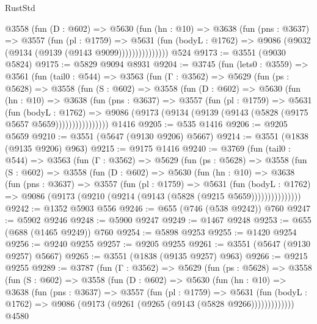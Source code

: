 \begin{lexlean}{RustStd}
\begin{coremodule}
              @3558
                (fun (D : @602) =>
                @5630
                  (fun (hn : @10) =>
                  @3638
                    (fun (pns : @3637) =>
                    @3557
                      (fun (pl : @1759) =>
                      @5631
                        (fun (bodyL : @1762) =>
                        @9086 (@9032 (@9134 (@9139 (@9143 @9099)))))))))))))))
    @524
@9173 := @3551 (@9030 @5824)
@9175 := @5829 @9094 @8931
@9204 := @3745
    (fun (lets0 : @3559) =>
    @3561
      (fun (tail0 : @544) =>
      @3563
        (fun (Γ : @3562) =>
        @5629
          (fun (ps : @5628) =>
          @3558
            (fun (S : @602) =>
            @3558
              (fun (D : @602) =>
              @5630
                (fun (hn : @10) =>
                @3638
                  (fun (pns : @3637) =>
                  @3557
                    (fun (pl : @1759) =>
                    @5631
                      (fun (bodyL : @1762) =>
                      @9086 (@9173 (@9134 (@9139 (@9143 (@5828 (@9175 @5657 @5659))))))))))))))))
    @1416
@9205 := @535 @1416
@9206 := @9205 @5659
@9210 := @3551 (@5647 (@9130 @9206) @5667)
@9214 := @3551 (@1838 (@9135 @9206) @963)
@9215 := @9175 @1416
@9240 := @3769
    (fun (tail0 : @544) =>
    @3563
      (fun (Γ : @3562) =>
      @5629
        (fun (ps : @5628) =>
        @3558
          (fun (S : @602) =>
          @3558
            (fun (D : @602) =>
            @5630
              (fun (hn : @10) =>
              @3638
                (fun (pns : @3637) =>
                @3557
                  (fun (pl : @1759) =>
                  @5631
                    (fun (bodyL : @1762) =>
                    @9086 (@9173 (@9210 (@9214 (@9143 (@5828 (@9215 @5659)))))))))))))))
@9242 := @1352 @5903 @556
@9246 := @655 (@746 (@538 @9242)) @760
@9247 := @5902 @9246
@9248 := @5900 @9247
@9249 := @1467 @9248
@9253 := @655 (@688 (@1465 @9249)) @760
@9254 := @5898 @9253
@9255 := @1420 @9254
@9256 := @9240 @9255
@9257 := @9205 @9255
@9261 := @3551 (@5647 (@9130 @9257) @5667)
@9265 := @3551 (@1838 (@9135 @9257) @963)
@9266 := @9215 @9255
@9289 := @3787
    (fun (Γ : @3562) =>
    @5629
      (fun (ps : @5628) =>
      @3558
        (fun (S : @602) =>
        @3558
          (fun (D : @602) =>
          @5630
            (fun (hn : @10) =>
            @3638
              (fun (pns : @3637) =>
              @3557
                (fun (pl : @1759) =>
                @5631
                  (fun (bodyL : @1762) =>
                  @9086 (@9173 (@9261 (@9265 (@9143 (@5828 @9266)))))))))))))
    @4580

\end{coremodule}
\end{lexlean}
